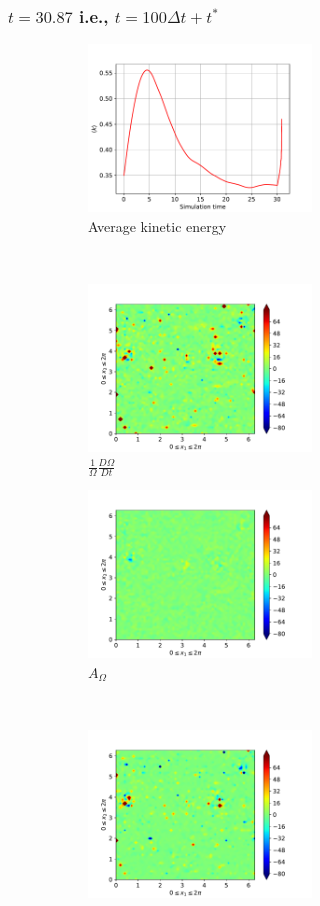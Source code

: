 \subsubsection{$t=30.87$ i.e., $t=100\Delta t + t^{\ast}$}
\begin{figure}[H]
    \begin{subfigure}[H]{0.45\textwidth}
        \includegraphics[height=1.75in]{media/run-cds-65/ke-average1420}
        \caption{Average kinetic energy}
    \end{subfigure}
    ~
    \begin{subfigure}[H]{0.45\textwidth}
        \includegraphics[height=1.75in]{media/run-cds-65/enst-1420}
        \caption{$\frac{1}{\Omega} \frac{D \Omega}{Dt}$}
    \end{subfigure}
    \newline
    \begin{subfigure}{0.45\textwidth}
        \includegraphics[height=1.75in]{media/run-cds-65/A-enst-1420}
        \caption{$A_{\Omega}$}
    \end{subfigure}
    ~
    \begin{subfigure}{0.45\textwidth}
        \includegraphics[height=1.75in]{media/run-cds-65/Pi-enst-1420}

\end{subfigure}
\end{figure}
